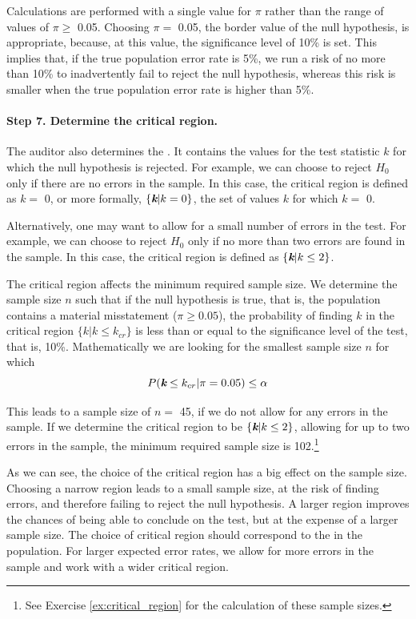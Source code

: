 Calculations are performed with a single value for $\pi$ rather than the range of values of $\pi \geq$ 0.05. Choosing $\pi =$ 0.05, the border value of the null hypothesis, is appropriate, because, at this value, the significance level of 10\% is set. This implies that, if the true population error rate is 5\%, we run a risk of no more than 10\% to inadvertently fail to reject the null hypothesis, whereas this risk is smaller when the true population error rate is higher than 5\%.

\paragraph{Step 7. Determine the critical region.} The auditor also determines the . It contains the values for the test statistic $k$ for which the null hypothesis is rejected. For example, we can choose to reject $H_0$ only if there are no errors in the sample. In this case, the critical region is defined as $k = $ 0, or more formally, $\{\textit{\textbf{k}} | k = 0\}$, the set of values $k$ for which $k =$ 0. 

Alternatively, one may want to allow for a small number of errors in the test. For example, we can choose to reject $H_0$ only if no more than two errors are found in the sample. In this case, the critical region is defined as  $\{\textit{\textbf{k}} | k \leq 2\}$.

\bigskip
The critical region affects the minimum required sample size. We determine the sample size $n$ such that if the null hypothesis is true, that is, the population contains a material misstatement ($\pi \geq 0.05$), the probability of finding $k$ in the critical region $\{k | k \leq k_{cr}\}$ is less than or equal to the significance level of the test, that is, 10\%. Mathematically we are looking for the smallest sample size $n$ for which
\begin{equation}
P(\textit{\textbf{k}} \leq k_{cr} | \pi = 0.05) \leq \alpha
\label{eq:sample_size _calculation_att}
\end{equation}

This leads to a sample size of $n =$ 45, if we do not allow for any errors in the sample. If we determine the critical region to be $\{\textit{\textbf{k}} | k \leq 2\}$, allowing for up to two errors in the sample, the minimum required sample size is 102.\footnote{See Exercise \ref{ex:critical_region} for the calculation of these sample sizes.}

As we can see, the choice of the critical region has a big effect on the sample size. Choosing a narrow region leads to a small sample size, at the risk of finding errors, and therefore failing to reject the null hypothesis. A larger region improves the chances of being able to conclude on the test, but at the expense of a larger sample size. The choice of critical region should correspond to the  in the population. For larger expected error rates, we allow for more errors in the sample and work with a wider critical region.

